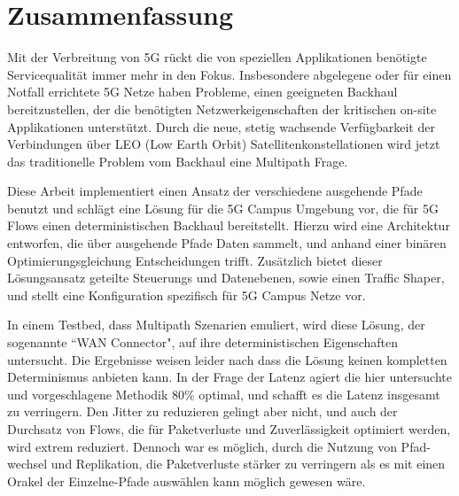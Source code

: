 \section*{Zusammenfassung}

Mit der Verbreitung von 5G rückt die von speziellen Applikationen benötigte Servicequalität immer mehr in den Fokus. Insbesondere abgelegene oder für einen Notfall errichtete 5G Netze haben Probleme, einen geeigneten Backhaul bereitzustellen, der die benötigten Netzwerkeigenschaften der kritischen on-site Applikationen unterstützt. Durch die neue, stetig wachsende Verfügbarkeit der Verbindungen über LEO (Low Earth Orbit) Satellitenkonstellationen wird jetzt das traditionelle Problem vom Backhaul eine Multipath Frage.

Diese Arbeit implementiert einen Ansatz der verschiedene ausgehende Pfade benutzt und schlägt eine Lösung für die 5G Campus Umgebung vor, die für 5G Flows einen deterministischen Backhaul bereitstellt. Hierzu wird eine Architektur entworfen, die über ausgehende Pfade Daten sammelt, und anhand einer binären Optimierungsgleichung Entscheidungen trifft. Zusätzlich bietet dieser Lösungsansatz geteilte Steuerungs und Datenebenen, sowie einen Traffic Shaper, und stellt eine Konfiguration spezifisch für 5G Campus Netze vor.

In einem Testbed, dass Multipath Szenarien emuliert, wird diese Lösung, der sogenannte “WAN Connector", auf ihre deterministischen Eigenschaften untersucht. Die Ergebnisse weisen leider nach dass die Lösung keinen kompletten Determinismus anbieten kann. In der Frage der Latenz agiert die hier untersuchte und vorgeschlagene Methodik 80\% optimal, und schafft es die Latenz insgesamt zu verringern. Den Jitter zu reduzieren gelingt aber nicht, und auch der Durchsatz von Flows, die für Paketverluste und Zuverlässigkeit optimiert werden, wird extrem reduziert. Dennoch war es möglich, durch die Nutzung von Pfad-wechsel und Replikation, die Paketverluste stärker zu verringern als es mit einen Orakel der Einzelne-Pfade auswählen kann möglich gewesen wäre.
